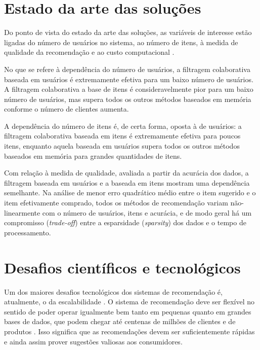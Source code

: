 \section{Estado da arte das soluções} %
\label{sec:estado_da_arte_das_solu_es}

Do ponto de vista do estado da arte das soluções, as variáveis de interesse estão ligadas do número de usuários no sistema, ao número de itens, à medida de qualidade da recomendação e ao custo computacional \cite{lee2012comparative}.

No que se refere à dependência do número de usuários, a filtragem colaborativa baseada em usuários é extremamente efetiva para um baixo número de usuários. A filtragem colaborativa a base de itens é consideravelmente pior para um baixo número de usuários, mas supera todos os outros métodos baseados em memória conforme o número de clientes aumenta.

A dependência do número de itens é, de certa forma, oposta à de usuários: a filtragem colaborativa baseada em itens é extremamente efetiva para poucos itens, enquanto aquela baseada em usuários supera todos os outros métodos baseados em memória para grandes quantidades de itens.

Com relação à medida de qualidade, avaliada a partir da acurácia dos dados, a filtragem baseada em usuários e a baseada em itens mostram uma dependência semelhante. Na análise de menor erro quadrático médio entre o item sugerido e o item efetivamente comprado, todos os métodos de recomendação variam não-linearmente com o número de usuários, itens e acurácia, e de modo geral há um compromisso (\textit{trade-off}) entre a esparsidade (\textit{sparsity}) dos dados e o tempo de processamento. 

\section{Desafios científicos e tecnológicos} %
\label{sec:desafios_cient_ficos_e_tecnol_gicos}

Um dos maiores desafios tecnológicos dos sistemas de recomendação é, atualmente, o da escalabilidade \cite{wei2007survey}. O sistema de recomendação deve ser flexível no sentido de poder operar igualmente bem tanto em pequenas quanto em grandes bases de dados, que podem chegar até centenas de milhões de clientes \cite{amazoncustomers} e de produtos \cite{amazonproducts}. Isso significa que as recomendações devem ser suficientemente rápidas e ainda assim prover sugestões valiosas aos consumidores. 

